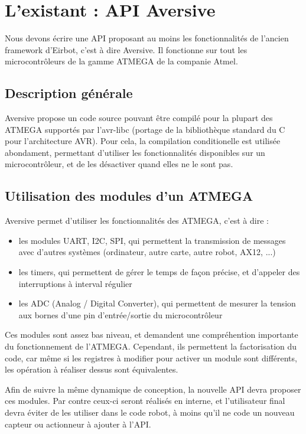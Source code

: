\section{L'existant : API Aversive}

Nous devons écrire une API proposant au moins les fonctionnalités de l'ancien framework d'Eirbot, c'est à dire Aversive. Il fonctionne sur tout les microcontrôleurs de la gamme ATMEGA de la companie Atmel.

\subsection{Description générale}

Aversive propose un code source pouvant être compilé pour la plupart des ATMEGA supportés par l'avr-libc (portage de la bibliothèque standard du C pour l'architecture AVR). Pour cela, la compilation conditionelle est utilisée abondament, permettant d'utiliser les fonctionnalités disponibles sur un microcontrôleur, et de les désactiver quand elles ne le sont pas.

\subsection{Utilisation des modules d'un ATMEGA}

Aversive permet d'utiliser les fonctionnalités des ATMEGA, c'est à dire :
\begin{itemize}
    \item{les modules UART, I2C, SPI, qui permettent la transmission de messages avec d'autres systèmes (ordinateur, autre carte, autre robot, AX12, ...)}
    \item{les timers, qui permettent de gérer le temps de façon précise, et d'appeler des interruptions à interval régulier}
    \item{les ADC (Analog / Digital Converter), qui permettent de mesurer la tension aux bornes d'une pin d'entrée/sortie du microcontrôleur}
\end{itemize}

Ces modules sont assez bas niveau, et demandent une compréhention importante du fonctionnement de l'ATMEGA. Cependant, ils permettent la factorisation du code, car même si les registres à modifier pour activer un module sont différents, les opération à réaliser dessus sont équivalentes.

Afin de suivre la même dynamique de conception, la nouvelle API devra proposer ces modules. Par contre ceux-ci seront réalisés en interne, et l'utilisateur final devra éviter de les utiliser dans le code robot, à moins qu'il ne code un nouveau capteur ou actionneur à ajouter à l'API.

